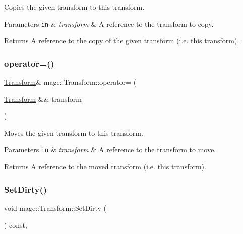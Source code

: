 Copies the given transform to this transform.


\begin{DoxyParams}[1]{Parameters}
\mbox{\tt in}  & {\em transform} & A reference to the transform to copy. \\
\hline
\end{DoxyParams}
\begin{DoxyReturn}{Returns}
A reference to the copy of the given transform (i.\+e. this transform). 
\end{DoxyReturn}
\hypertarget{classmage_1_1_transform_a73f47760665264da8af254fa937b3560}{}\label{classmage_1_1_transform_a73f47760665264da8af254fa937b3560} 
\subsubsection{\texorpdfstring{operator=()}{operator=()}\hspace{0.1cm}{\footnotesize\ttfamily [2/2]}}
{\footnotesize\ttfamily \hyperlink{classmage_1_1_transform}{Transform}\& mage\+::\+Transform\+::operator= (\begin{DoxyParamCaption}\item[{\hyperlink{classmage_1_1_transform}{Transform} \&\&}]{transform }\end{DoxyParamCaption})\hspace{0.3cm}{\ttfamily [default]}}

Moves the given transform to this transform.


\begin{DoxyParams}[1]{Parameters}
\mbox{\tt in}  & {\em transform} & A reference to the transform to move. \\
\hline
\end{DoxyParams}
\begin{DoxyReturn}{Returns}
A reference to the moved transform (i.\+e. this transform). 
\end{DoxyReturn}
\hypertarget{classmage_1_1_transform_a8d760d79f5ad68377706234b8575e429}{}\label{classmage_1_1_transform_a8d760d79f5ad68377706234b8575e429} 
\subsubsection{\texorpdfstring{Set\+Dirty()}{SetDirty()}}
{\footnotesize\ttfamily void mage\+::\+Transform\+::\+Set\+Dirty (\begin{DoxyParamCaption}{ }\end{DoxyParamCaption}) const\hspace{0.3cm}{\ttfamily [private]}, {\ttfamily [noexcept]}}

